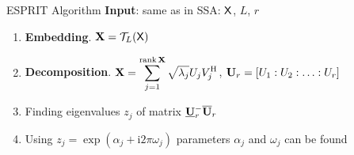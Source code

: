 \documentclass[pdf, unicode, ucs, notheorems]{beamer}
\theoremstyle{definition}
\begin{document}
\begin{frame}{ESPRIT Algorithm}
  \textbf{Input}: same as in SSA: $\mathsf{X}$, $L$, $r$
  \begin{enumerate}
    \item \textbf{Embedding}. $\mathbf{X} = \mathcal{T}_L(\mathsf{X})$
    \item \textbf{Decomposition}.
      $\displaystyle\mathbf{X} = \sum_{j=1}^{\operatorname{rank}\mathbf{X}}
      \sqrt{\lambda_j} U_j V_j^{\mathrm{H}}$,
      $\mathbf{U}_r = \left[U_1: U_2: \ldots: U_r\right]$
    \item Finding eigenvalues $z_j$ of matrix
      $\underline{\mathbf{U}}_r^{-}\overline{\mathbf{U}}_r$
    \item Using $z_j = \exp(\alpha_j + \mathrm{i}2\pi\omega_j)$
      parameters $\alpha_j$ and $\omega_j$ can be found
  \end{enumerate}
\end{frame}
\end{document}

